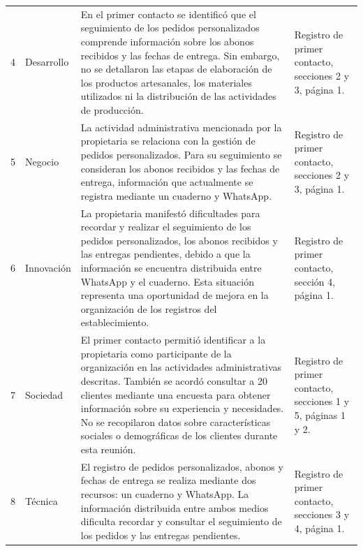 \documentclass[11pt,a4paper]{article}
\begin{document}
{\begin{xltabular}{\textwidth}{@{}c Y Y Y@{}}
			4 &
			Desarrollo &
			En el primer contacto se identificó que el seguimiento de los pedidos personalizados comprende información sobre los abonos recibidos y las fechas de entrega. Sin embargo, no se detallaron las etapas de elaboración de los productos artesanales, los materiales utilizados ni la distribución de las actividades de producción. &
			Registro de primer contacto, secciones 2 y 3, página 1. \\
			
			5 &
			Negocio &
			La actividad administrativa mencionada por la propietaria se relaciona con la gestión de pedidos personalizados. Para su seguimiento se consideran los abonos recibidos y las fechas de entrega, información que actualmente se registra mediante un cuaderno y WhatsApp. &
			Registro de primer contacto, secciones 2 y 3, página 1. \\
			
			6 &
			Innovación &
			La propietaria manifestó dificultades para recordar y realizar el seguimiento de los pedidos personalizados, los abonos recibidos y las entregas pendientes, debido a que la información se encuentra distribuida entre WhatsApp y el cuaderno. Esta situación representa una oportunidad de mejora en la organización de los registros del establecimiento. &
			Registro de primer contacto, sección 4, página 1. \\
			
			7 &
			Sociedad &
			El primer contacto permitió identificar a la propietaria como participante de la organización en las actividades administrativas descritas. También se acordó consultar a 20 clientes mediante una encuesta para obtener información sobre su experiencia y necesidades. No se recopilaron datos sobre características sociales o demográficas de los clientes durante esta reunión. &
			Registro de primer contacto, secciones 1 y 5, páginas 1 y 2. \\
			
			8 &
			Técnica &
			El registro de pedidos personalizados, abonos y fechas de entrega se realiza mediante dos recursos: un cuaderno y WhatsApp. La información distribuida entre ambos medios dificulta recordar y consultar el seguimiento de los pedidos y las entregas pendientes. &
			Registro de primer contacto, secciones 3 y 4, página 1. \\
			
		\end{xltabular}
	}
	
	
\end{document}
